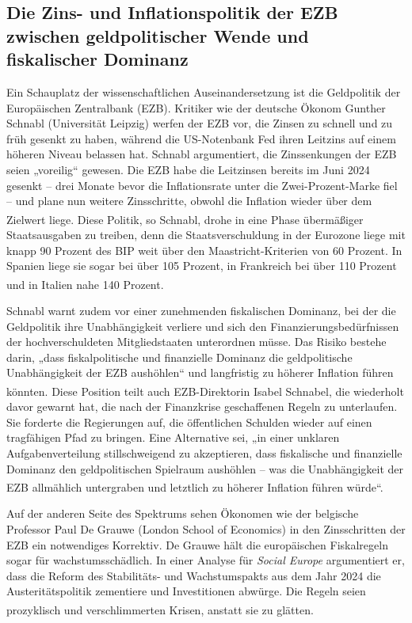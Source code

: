 \documentclass[12pt,a4paper]{article}
\newcommand{\footcite}[1]{\textsuperscript{\cite{#1}}}
\begin{document}
	\subsection{Die Zins- und Inflationspolitik der EZB zwischen geldpolitischer Wende und fiskalischer Dominanz}
	
	Ein Schauplatz der wissenschaftlichen Auseinandersetzung ist die Geldpolitik der Europäischen Zentralbank (EZB). Kritiker wie der deutsche Ökonom Gunther Schnabl (Universität Leipzig) werfen der EZB vor, die Zinsen zu schnell und zu früh gesenkt zu haben, während die US-Notenbank Fed ihren Leitzins auf einem höheren Niveau belassen hat. Schnabl argumentiert, die Zinssenkungen der EZB seien „voreilig“ gewesen. Die EZB habe die Leitzinsen bereits im Juni 2024 gesenkt – drei Monate bevor die Inflationsrate unter die Zwei-Prozent-Marke fiel – und plane nun weitere Zinsschritte, obwohl die Inflation wieder über dem Zielwert liege.\footcite{Schnabl2025a} Diese Politik, so Schnabl, drohe in eine Phase übermäßiger Staatsausgaben zu treiben, denn die Staatsverschuldung in der Eurozone liege mit knapp 90 Prozent des BIP weit über den Maastricht-Kriterien von 60 Prozent. In Spanien liege sie sogar bei über 105 Prozent, in Frankreich bei über 110 Prozent und in Italien nahe 140 Prozent.\footcite{Schnabl2025a}
	
	Schnabl warnt zudem vor einer zunehmenden fiskalischen Dominanz, bei der die Geldpolitik ihre Unabhängigkeit verliere und sich den Finanzierungsbedürfnissen der hochverschuldeten Mitgliedstaaten unterordnen müsse. Das Risiko bestehe darin, „dass fiskalpolitische und finanzielle Dominanz die geldpolitische Unabhängigkeit der EZB aushöhlen“ und langfristig zu höherer Inflation führen könnten.\footcite{Schnabl2025c} Diese Position teilt auch EZB-Direktorin Isabel Schnabel, die wiederholt davor gewarnt hat, die nach der Finanzkrise geschaffenen Regeln zu unterlaufen. Sie forderte die Regierungen auf, die öffentlichen Schulden wieder auf einen tragfähigen Pfad zu bringen. Eine Alternative sei, „in einer unklaren Aufgabenverteilung stillschweigend zu akzeptieren, dass fiskalische und finanzielle Dominanz den geldpolitischen Spielraum aushöhlen – was die Unabhängigkeit der EZB allmählich untergraben und letztlich zu höherer Inflation führen würde“.\footcite{Schnabl2025c}
	
	Auf der anderen Seite des Spektrums sehen Ökonomen wie der belgische Professor Paul De Grauwe (London School of Economics) in den Zinsschritten der EZB ein notwendiges Korrektiv. De Grauwe hält die europäischen Fiskalregeln sogar für wachstumsschädlich. In einer Analyse für \textit{Social Europe} argumentiert er, dass die Reform des Stabilitäts- und Wachstumspakts aus dem Jahr 2024 die Austeritätspolitik zementiere und Investitionen abwürge. Die Regeln seien prozyklisch und verschlimmerten Krisen, anstatt sie zu glätten.\footcite{DeGrauwe2024}
	
\end{document}
